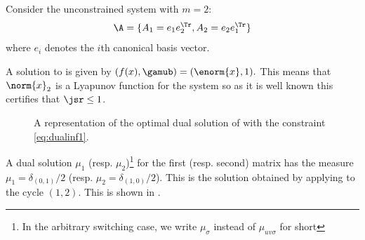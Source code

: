 \begin{myexem}
  \label{exem:simple0}
  Consider the unconstrained system \cite[Example~2.1]{ahmadi2012joint} with $m=2$:
  \[ \A = \{ A_1 = e_1e_2^\Tr , A_2 = e_2e_1^\Tr  \} \]
  where $e_i$ denotes the $i$th canonical basis vector.

  A solution to  is given by
  \( (f(x), \gamub) = (\enorm{x}, 1). \)
  This means that $\norm{x}_2$ is a Lyapunov function for the system so as it is well known
  this certifies that $\jsr \leq 1$.

  \begin{figure}[!ht]
    \centering
    \caption{A representation of the optimal dual solution of  with the constraint \eqref{eq:dualinf1}.}
    \label{fig:simple0}
  \end{figure}

  A dual solution $\mu_1$ (resp. $\mu_2$)\footnote{In the arbitrary switching case, we write $\mu_\sigma$ instead of $\mu_{uv\sigma}$ for short}
  for the first (resp. second) matrix has the measure $\mu_1 = \delta_{(0,1)}/2$ (resp. $\mu_2 = \delta_{(1,0)}/2$).
  This is the solution obtained by applying  to the cycle $(1, 2)$.
  This is shown in .

\end{myexem}

